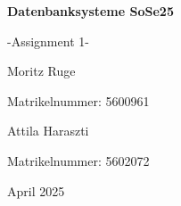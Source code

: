 \documentclass{article}
\begin{document}
\begin{titlepage}
    \centering
    \vspace*{3cm}
    {\Huge\bfseries Datenbanksysteme SoSe25 \par}
    \vspace{0.5cm}
    {\Huge -Assignment 1- \par}
    \vspace{1cm}
    {\Large Moritz Ruge \par}
    \vspace{0.1cm}
    {\small Matrikelnummer: 5600961 \par}
    {\Large Attila Haraszti \par}
    \vspace{0.1cm}
    {\small Matrikelnummer: 5602072\par}
    \vfill
    {\large April 2025}
\end{titlepage}


\end{document}

